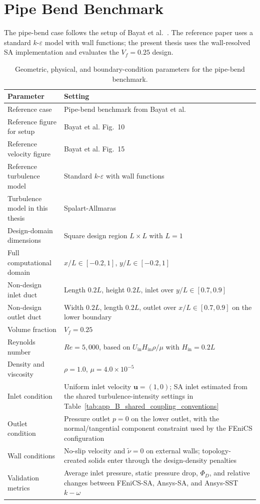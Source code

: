 \FloatBarrier

\section{Pipe Bend Benchmark}
\label{sec:app_B_config_alexandersen_pipebend}

The pipe-bend case follows the setup of Bayat et al.~\cite{Bayat2026}. The reference paper uses a standard $k$-$\varepsilon$ model with wall functions; the present thesis uses the wall-resolved SA implementation and evaluates the $V_f=0.25$ design.

\begin{table}[htbp]
	\centering
	\footnotesize
	\caption{Geometric, physical, and boundary-condition parameters for the pipe-bend benchmark.}
	\label{tab:app_B_alexandersen_pipebend_physical}
	\renewcommand{\arraystretch}{1.2}
	\begin{tabularx}{\textwidth}{l X}
		\hline
		\textbf{Parameter} & \textbf{Setting} \\
		\hline
		Reference case & Pipe-bend benchmark from Bayat et al.~\cite{Bayat2026} \\
		Reference figure for setup & Bayat et al. Fig.~10 \\
		Reference velocity figure & Bayat et al. Fig.~15 \\
		Reference turbulence model & Standard $k$-$\varepsilon$ with wall functions \\
		Turbulence model in this thesis & Spalart-Allmaras \\
		Design-domain dimensions & Square design region $L\times L$ with $L=1$ \\
		Full computational domain & $x/L\in[-0.2,1]$, $y/L\in[-0.2,1]$ \\
		Non-design inlet duct & Length $0.2L$, height $0.2L$, inlet over $y/L\in[0.7,0.9]$ \\
		Non-design outlet duct & Width $0.2L$, length $0.2L$, outlet over $x/L\in[0.7,0.9]$ on the lower boundary \\
		Volume fraction & $V_f=0.25$ \\
		Reynolds number & $Re=5{,}000$, based on $U_{\mathrm{in}}H_{\mathrm{in}}\rho/\mu$ with $H_{\mathrm{in}}=0.2L$ \\
		Density and viscosity & $\rho=1.0$, $\mu=4.0\times10^{-5}$ \\
		Inlet condition & Uniform inlet velocity $\mathbf{u}=(1,0)$; SA inlet estimated from the shared turbulence-intensity settings in Table~\ref{tab:app_B_shared_coupling_conventions} \\
		Outlet condition & Pressure outlet $p=0$ on the lower outlet, with the normal/tangential component constraint used by the FEniCS configuration \\
		Wall conditions & No-slip velocity and $\tilde{\nu}=0$ on external walls; topology-created solids enter through the design-density penalties \\
		Validation metrics & Average inlet pressure, static pressure drop, $\Phi_D$, and relative changes between FEniCS-SA, Ansys-SA, and Ansys-SST $k-\omega$ \\
		\hline
	\end{tabularx}
\end{table}

